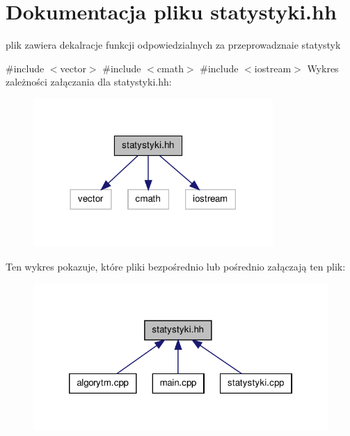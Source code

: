 \hypertarget{statystyki_8hh}{\section{\-Dokumentacja pliku statystyki.\-hh}
\label{statystyki_8hh}
}


plik zawiera dekalracje funkcji odpowiedzialnych za przeprowadznaie statystyk  


{\ttfamily \#include $<$vector$>$}\*
{\ttfamily \#include $<$cmath$>$}\*
{\ttfamily \#include $<$iostream$>$}\*
\-Wykres zależności załączania dla statystyki.\-hh\-:\nopagebreak
\begin{figure}[H]
\begin{center}
\leavevmode
\includegraphics[width=258pt]{statystyki_8hh__incl}
\end{center}
\end{figure}
\-Ten wykres pokazuje, które pliki bezpośrednio lub pośrednio załączają ten plik\-:\nopagebreak
\begin{figure}[H]
\begin{center}
\leavevmode
\includegraphics[width=322pt]{statystyki_8hh__dep__incl}
\end{center}
\end{figure}
